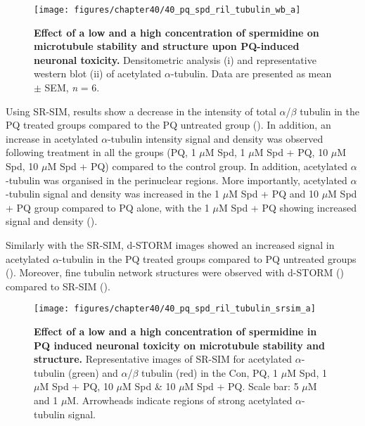 \begin{figure}[!htbp]
\center
  \texttt{[image: figures/chapter40/40\_pq\_spd\_ril\_tubulin\_wb\_a]}
  \caption[Effect of a low and a high concentration of spermidine on microtubule stability and structure upon PQ-induced neuronal toxicity]{\textbf{Effect of a low and a high concentration of spermidine on microtubule stability and structure upon PQ-induced neuronal toxicity.} Densitometric analysis (i) and representative western blot  (ii) of acetylated $\alpha$-tubulin. Data are presented as mean $\pm$ SEM, \textit{n} = 6.}
  \label{fig:40_pq_spd_ril_tubulin_wb_a}
\end{figure} 

Using SR-SIM, results show a decrease in the intensity of total $\alpha$/$\beta$ tubulin in the PQ treated groups compared to the PQ untreated group (). In addition, an increase in acetylated $\alpha$-tubulin intensity signal and density was observed following treatment in all the groups (PQ, 1 $\mu$M Spd, 1 $\mu$M Spd + PQ, 10 $\mu$M Spd, 10 $\mu$M Spd + PQ) compared to the control group. In addition, acetylated $\alpha$-tubulin was organised in the perinuclear regions. More importantly, acetylated $\alpha$-tubulin signal and density was increased in the 1 $\mu$M Spd + PQ and 10 $\mu$M Spd + PQ group compared to PQ alone, with the 1 $\mu$M Spd + PQ showing increased signal and density (). 

Similarly with the SR-SIM, d-STORM images showed an increased signal in acetylated $\alpha$-tubulin in the PQ treated groups compared to PQ untreated groups (). Moreover, fine tubulin network structures were observed with d-STORM () compared to SR-SIM ().

\begin{landscape}\centering
\begin{figure}
\vspace*{\fill}
\centering
  \texttt{[image: figures/chapter40/40\_pq\_spd\_ril\_tubulin\_srsim\_a]}
  \caption[Effect of a low and a high concentration of spermidine in PQ induced neuronal toxicity on microtubule stability and structure]{\textbf{Effect of a low and a high concentration of spermidine in PQ induced neuronal toxicity on microtubule stability and structure.} Representative images of SR-SIM for acetylated $\alpha$-tubulin (green) and $\alpha$/$\beta$ tubulin (red) in the Con, PQ, 1 $\mu$M Spd, 1 $\mu$M Spd + PQ, 10 $\mu$M Spd \& 10 $\mu$M Spd + PQ. Scale bar: 5 $\mu$M and 1 $\mu$M. Arrowheads indicate regions of strong acetylated $\alpha$-tubulin signal.}
  \label{fig:40_pq_spd_ril_tubulin_srsim_a}
\end{figure} 
\end{landscape}

